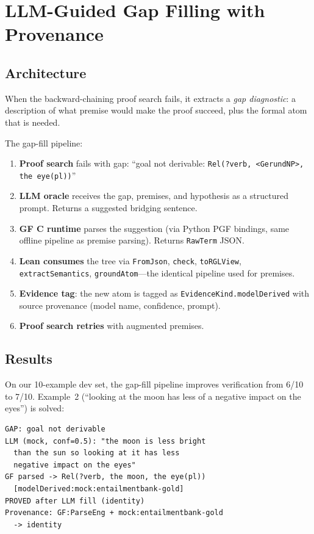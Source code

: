 \documentclass[]{article}
\newcommand{\code}[1]{\texttt{#1}}
\begin{document}
\section{LLM-Guided Gap Filling with Provenance}
\label{sec:gapfill}

\subsection{Architecture}

When the backward-chaining proof search fails, it extracts a
\emph{gap diagnostic}: a description of what premise would make the
proof succeed, plus the formal atom that is needed.

The gap-fill pipeline:
\begin{enumerate}
\item \textbf{Proof search} fails with gap: ``goal not derivable:
  \code{Rel(?verb, <GerundNP>, the eye(pl))}''
\item \textbf{LLM oracle} receives the gap, premises, and hypothesis
  as a structured prompt. Returns a suggested bridging sentence.
\item \textbf{GF C runtime} parses the suggestion (via Python PGF
  bindings, same offline pipeline as premise parsing). Returns
  \code{RawTerm} JSON.
\item \textbf{Lean consumes} the tree via \code{FromJson},
  \code{check}, \code{toRGLView}, \code{extractSemantics},
  \code{groundAtom}---the identical pipeline used for premises.
\item \textbf{Evidence tag}: the new atom is tagged as
  \code{EvidenceKind.modelDerived} with source provenance
  (model name, confidence, prompt).
\item \textbf{Proof search retries} with augmented premises.
\end{enumerate}

\subsection{Results}

On our 10-example dev set, the gap-fill pipeline improves
verification from 6/10 to 7/10.  Example~2 (``looking at the moon
has less of a negative impact on the eyes'') is solved:

\begin{lstlisting}
GAP: goal not derivable
LLM (mock, conf=0.5): "the moon is less bright
  than the sun so looking at it has less
  negative impact on the eyes"
GF parsed -> Rel(?verb, the moon, the eye(pl))
  [modelDerived:mock:entailmentbank-gold]
PROVED after LLM fill (identity)
Provenance: GF:ParseEng + mock:entailmentbank-gold
  -> identity
\end{lstlisting}
\end{document}
